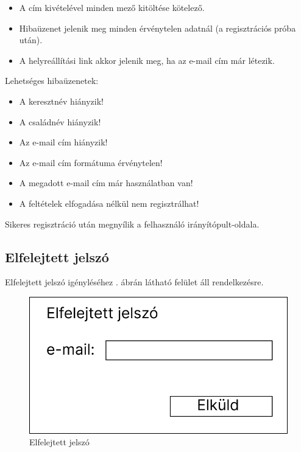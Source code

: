 \documentclass[a4paper,12pt]{article}
\begin{document}
\begin{itemize}
	\item A cím kivételével minden mező kitöltése kötelező.
	\item Hibaüzenet jelenik meg minden érvénytelen adatnál (a regisztrációs próba után).
	\item A helyreállítási link akkor jelenik meg, ha az e-mail cím már létezik.
\end{itemize}

Lehetséges hibaüzenetek:
\begin{itemize}
	\item A keresztnév hiányzik!
	\item A családnév hiányzik!
	\item Az e-mail cím hiányzik!
	\item Az e-mail cím formátuma érvénytelen!
	\item A megadott e-mail cím már használatban van!
	\item A feltételek elfogadása nélkül nem regisztrálhat!
\end{itemize}

Sikeres regisztráció után megnyílik a felhasználó irányítópult-oldala.

\subsection{Elfelejtett jelszó}

Elfelejtett jelszó igényléséhez . ábrán látható felület áll rendelkezésre.

\begin{figure}[h!]
	\centering
	\includegraphics[scale=0.4]{images/Web_pages/Forgotten_Password.jpg}
	\caption{Elfelejtett jelszó}
	\label{fig:Forgotten_Password}
\end{figure}
\end{document}
